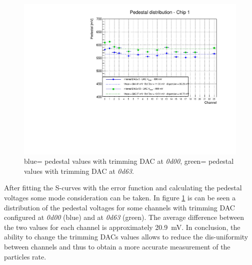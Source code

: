 \begin{figure}[H]
	\centering
	\includegraphics[width=0.8\linewidth]{IMG/ch5/DataDacConfig/DAC_V_REF_600mv-Copia.pdf}
	\caption{{\color{blue}blue}= pedestal values with trimming DAC at \textit{0d00}, {\color{green}green}= pedestal values with trimming DAC at \textit{0d63}.}
	\label{fig:pedestal}
\end{figure}
\noindent After fitting the S-curves with the error function and calculating the pedestal voltages some mode consideration can be taken.
In figure \ref{fig:pedestal} is can be seen a distribution of the pedestal voltages for some channels with trimming DAC configured at \textit{0d00} (blue) and at \textit{0d63} (green).
The average difference between the two values for each channel is approximately 20.9~mV.
In conclusion, the ability to change the trimming DACs values allows to reduce the dis-uniformity between channels and thus to obtain a more accurate measurement of the particles rate.
\newpage
